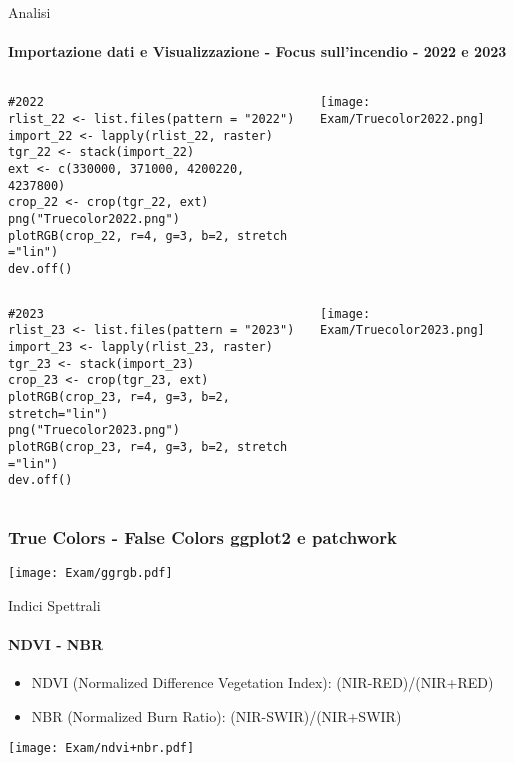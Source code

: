\documentclass{beamer}
\begin{document}
\begin{frame}[fragile]{Analisi}
    \framesubtitle{Importazione dati e Visualizzazione - Focus sull'incendio - 2022 e 2023}
    \begin{columns}
        \begin{column}{0.6\textwidth}
            \begin{lstlisting}[style=mystyle]
#2022
rlist_22 <- list.files(pattern = "2022") 
import_22 <- lapply(rlist_22, raster)
tgr_22 <- stack(import_22)
ext <- c(330000, 371000, 4200220, 4237800)
crop_22 <- crop(tgr_22, ext) 
png("Truecolor2022.png")
plotRGB(crop_22, r=4, g=3, b=2, stretch ="lin")
dev.off()
            \end{lstlisting}
        \end{column}
 \begin{column}{0.3\textwidth}
            \texttt{[image: Exam/Truecolor2022.png]}
        \end{column}
    \end{columns}
 \begin{columns}
        \begin{column}{0.6\textwidth}
 \begin{lstlisting}[style=mystyle]
#2023
rlist_23 <- list.files(pattern = "2023") 
import_23 <- lapply(rlist_23, raster)
tgr_23 <- stack(import_23)
crop_23 <- crop(tgr_23, ext) 
plotRGB(crop_23, r=4, g=3, b=2, stretch="lin")
png("Truecolor2023.png")
plotRGB(crop_23, r=4, g=3, b=2, stretch ="lin")
dev.off()
 \end{lstlisting}
\end{column}
        \begin{column}{0.3\textwidth}
            \texttt{[image: Exam/Truecolor2023.png]}
        \end{column}
    \end{columns}

\end{frame}


\begin{frame}[fragile]
    \frametitle{\scriptsize True Colors - False Colors ggplot2 e patchwork}
             
              \texttt{[image: Exam/ggrgb.pdf]}
                \centering
              
\end{frame}

\begin{frame}[fragile]{Indici Spettrali}
    \framesubtitle{NDVI - NBR}
 \begin{itemize}
        \item \scriptsize NDVI (Normalized Difference Vegetation Index): (NIR-RED)/(NIR+RED)
        \item NBR (Normalized Burn Ratio): (NIR-SWIR)/(NIR+SWIR)
\end{itemize}
 
            \begin{center} 
        \texttt{[image: Exam/ndvi+nbr.pdf]}
    \end{center}
\end{frame}
\end{document}

